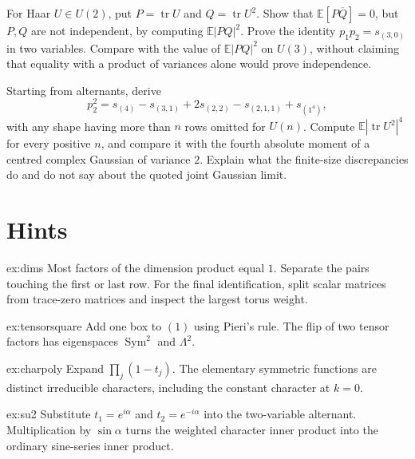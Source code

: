 \begin{exercise}[$\star\star$]\label{ex:v10exp-ch11-dependent}
For Haar $U\in U(2)$, put $P=\operatorname{tr}U$ and $Q=\operatorname{tr}U^2$. Show that $\mathbb E[P\overline Q]=0$, but $P,Q$ are not independent, by computing $\mathbb E|PQ|^2$. Prove the identity $p_1p_2=s_{(3,0)}$ in two variables. Compare with the value of $\mathbb E|PQ|^2$ on $U(3)$, without claiming that equality with a product of variances alone would prove independence.
\end{exercise}

\begin{exercise}[$\star\star\star$]\label{ex:v10exp-ch11-fourthpowertrace}
Starting from alternants, derive
\[
 p_2^2=s_{(4)}-s_{(3,1)}+2s_{(2,2)}-s_{(2,1,1)}+s_{(1^4)},
\]
with any shape having more than $n$ rows omitted for $U(n)$. Compute $\mathbb E|\operatorname{tr}U^2|^4$ for every positive $n$, and compare it with the fourth absolute moment of a centred complex Gaussian of variance $2$. Explain what the finite-size discrepancies do and do not say about the quoted joint Gaussian limit.
\end{exercise}

\section{Hints}

\begin{hint}{ex:dims}
Most factors of the dimension product equal $1$. Separate the pairs touching the first or last row. For the final identification, split scalar matrices from trace-zero matrices and inspect the largest torus weight.
\end{hint}

\begin{hint}{ex:tensorsquare}
Add one box to $(1)$ using Pieri's rule. The flip of two tensor factors has eigenspaces $\operatorname{Sym}^2$ and $\Lambda^2$.
\end{hint}

\begin{hint}{ex:charpoly}
Expand $\prod_j(1-t_j)$. The elementary symmetric functions are distinct irreducible characters, including the constant character at $k=0$.
\end{hint}

\begin{hint}{ex:su2}
Substitute $t_1=e^{i\alpha}$ and $t_2=e^{-i\alpha}$ into the two-variable alternant. Multiplication by $\sin\alpha$ turns the weighted character inner product into the ordinary sine-series inner product.
\end{hint}

